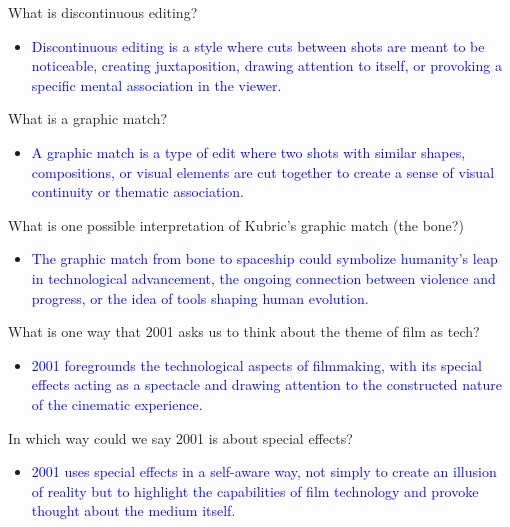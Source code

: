 \documentclass[11pt,fleqn]{book} %
\begin{document}
\begin{exercise}
What is discontinuous editing?
\begin{itemize}
\item \textcolor{blue}{Discontinuous editing is a style where cuts between shots are meant to be noticeable, creating juxtaposition, drawing attention to itself, or provoking a specific mental association in the viewer.}
\end{itemize}
\end{exercise}

\begin{exercise}
What is a graphic match?
\begin{itemize}
\item \textcolor{blue}{A graphic match is a type of edit where two shots with similar shapes, compositions, or visual elements are cut together to create a sense of visual continuity or thematic association.}
\end{itemize}
\end{exercise}

\begin{exercise}
What is one possible interpretation of Kubric's graphic match (the bone?)
\begin{itemize}
\item \textcolor{blue}{The graphic match from bone to spaceship could symbolize humanity's leap in technological advancement, the ongoing connection between violence and progress, or the idea of  tools shaping human evolution.}
\end{itemize}
\end{exercise}

\begin{exercise}
What is one way that 2001 asks us to think about the theme of film as tech?
\begin{itemize}
\item \textcolor{blue}{2001 foregrounds the technological aspects of filmmaking, with its special effects acting as a spectacle and drawing attention to the constructed nature of the cinematic experience.}
\end{itemize}
\end{exercise}

\begin{exercise}
In which way could we say 2001 is about special effects?
\begin{itemize}
\item \textcolor{blue}{2001  uses special effects in a self-aware way, not simply to create an illusion of reality but to highlight the capabilities of film technology and provoke thought about the medium itself.}
\end{itemize}
\end{exercise}
\end{document}
